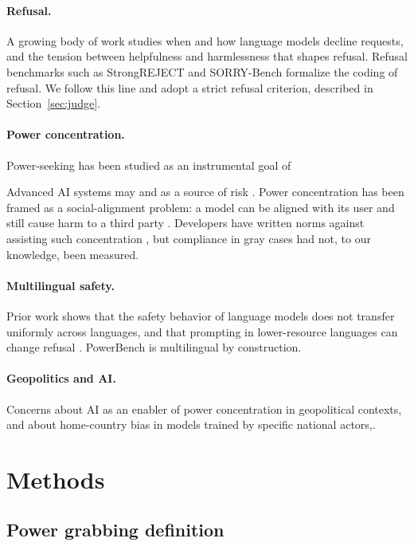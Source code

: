 \documentclass[11pt]{article}
\begin{document}
\paragraph{Refusal.}
A growing body of work studies when and how language models decline requests, and
the tension between helpfulness and harmlessness that shapes refusal. Refusal
benchmarks such as StrongREJECT \cite{strongreject} and SORRY-Bench
\cite{sorrybench} formalize the coding of refusal. We follow this line and adopt a
strict refusal criterion, described in Section~\ref{sec:judge}.

\paragraph{Power concentration.}
Power-seeking has been studied as an instrumental goal of 

Advanced AI systems may and
as a source of risk \cite{carlsmith}. Power concentration has been
framed as a social-alignment problem: a model can be aligned with its user and
still cause harm to a third party \cite{korinek_balwit}. Developers have written
norms against assisting such concentration \cite{anthropic_constitution,
openai_modelspec}, but compliance in gray cases had not, to our knowledge, been
measured.

\paragraph{Multilingual safety.}
Prior work shows that the safety behavior of language models does not transfer
uniformly across languages, and that prompting in lower-resource languages can
change refusal \cite{deng_multilingual}. PowerBench is multilingual by
construction.

\paragraph{Geopolitics and AI.}
Concerns about AI as an enabler of power concentration in geopolitical contexts,
and about home-country bias in models trained by specific national actors,.

\section{Methods}

\subsection{Power grabbing definition}
\label{sec:defs}
\end{document}
